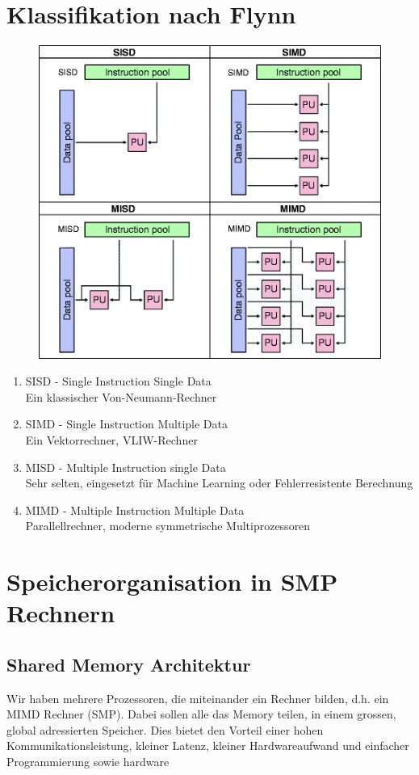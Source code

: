 \section{Klassifikation nach Flynn}
\begin{figure}
\centering
\includegraphics[width=0.7\linewidth]{fig/flynn}
\caption{}
\label{fig:flynn}
\end{figure}
\begin{enumerate}
	\item {SISD - Single Instruction Single Data} \\
		Ein klassischer Von-Neumann-Rechner
	\item {SIMD - Single Instruction Multiple Data} \\
		Ein Vektorrechner, VLIW-Rechner
	\item {MISD - Multiple Instruction single Data} \\
		Sehr selten, eingesetzt für Machine Learning oder Fehlerresistente Berechnung
	\item {MIMD - Multiple Instruction Multiple Data} \\
		Parallellrechner, moderne symmetrische Multiprozessoren
\end{enumerate}

\section{Speicherorganisation in SMP Rechnern}

\subsection{Shared Memory Architektur}
Wir haben mehrere Prozessoren, die miteinander ein Rechner bilden, d.h. ein MIMD Rechner (SMP). Dabei sollen alle das Memory teilen, in einem grossen, global adressierten Speicher. Dies bietet den Vorteil einer hohen Kommunikationsleistung, kleiner Latenz, kleiner Hardwareaufwand und einfacher Programmierung sowie hardware
